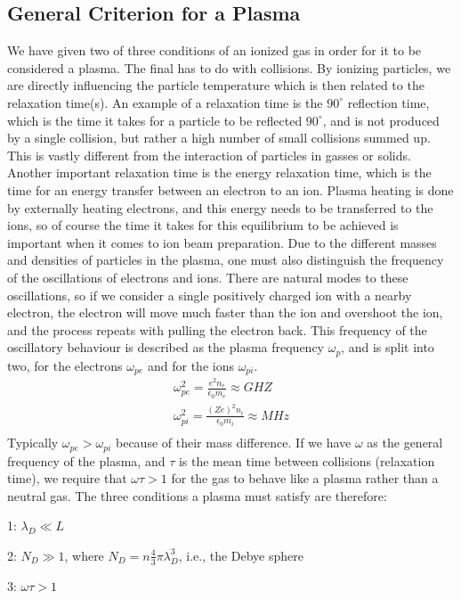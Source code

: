 \subsection{General Criterion for a Plasma}\label{subsec:general-criterion-for-a-plasma}
We have given two of three conditions of an ionized gas in order for it to be considered a plasma.
The final has to do with collisions.
By ionizing particles, we are directly influencing the particle temperature which is then related to the relaxation time(s).
An example of a relaxation time is the $90^{\circ}$ reflection time, which is the time it takes for a particle to be reflected $90^\circ$, and is not produced by a single collision, but rather a high number of small collisions summed up.
This is vastly different from the interaction of particles in gasses or solids.
Another important relaxation time is the energy relaxation time, which is the time for an energy transfer between an electron to an ion.
Plasma heating is done by externally heating electrons, and this energy needs to be transferred to the ions, so of course the time it takes for this equilibrium to be achieved is important when it comes to ion beam preparation.
Due to the different masses and densities of particles in the plasma, one must also distinguish the frequency of the oscillations of electrons and ions.
There are natural modes to these oscillations, so if we consider a single positively charged ion with a nearby electron, the electron will move much faster than the ion and overshoot the ion, and the process repeats with pulling the electron back.
This frequency of the oscillatory behaviour is described as the plasma frequency $\omega_p$, and is split into two, for the electrons $\omega_{pe}$ and for the ions $\omega_{pi}$.
\begin{gather*}
    \omega_{pe}^2 = \frac{e^2 n_e}{\epsilon_0 m_e} \approx GHZ\\
    \omega_{pi}^2 = \frac{(Ze)^2 n_i}{\epsilon_0 m_i} \approx MHz\\
\end{gather*}
Typically $\omega_{pe} > \omega_{pi}$ because of their mass difference.
If we have $\omega$ as the general frequency of the plasma, and $\tau$ is the mean time between collisions (relaxation time), we require that $\omega \tau > 1$ for the gas to behave like a plasma rather than a neutral gas.
The three conditions a plasma must satisfy are therefore:
\begin{myitemize}
	\item 1: $\lambda_D \ll L $
	\item 2: $N_D \gg 1$, where $N_D = n\frac{4}{3} \pi \lambda_D^3$, i.e., the Debye sphere
	\item 3: $\omega \tau > 1$
\end{myitemize}

